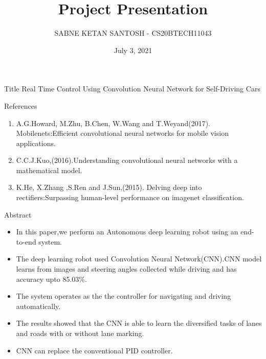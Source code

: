 \documentclass{beamer}
\title{Project Presentation}
\author{SABNE KETAN SANTOSH - CS20BTECH11043 }
\institute{Indian Institute of Technology, Hyderabad.}
\date{July 3, 2021}
\begin{document}
\begin{frame}
\titlepage
\end{frame}

\begin{frame}
    \begin{block}{Title}
      Real Time Control Using Convolution Neural Network for Self-Driving Cars  
    \end{block}
    
    \begin{block}{References}
    \begin{enumerate}
     \item A.G.Howard, M.Zhu, B.Chen, W.Wang and T.Weyand(2017). Mobilenets:Efficient convolutional neural networks for mobile vision applications.
     \item C.C.J.Kuo,(2016).Understanding convolutional neural networks with a mathematical model.
     \item K.He, X.Zhang ,S.Ren and J.Sun,(2015). Delving deep into rectifiers:Surpassing human-level performance on imagenet classification.
     \end{enumerate}
     \end{block}
\end{frame}

\begin{frame}
\begin{block}{Abstract}
\begin{itemize}
    \item In this paper,we perform an Autonomous deep learning robot using an end-to-end system.
    \item The deep learning robot used Convolution Neural Network(CNN).CNN model learns from images and steering angles collected while driving and has accuracy upto 85.03\%. 
    \item The system operates as the the controller for navigating and driving automatically.
    \item The results showed that the CNN is able to learn the diversified tasks of lanes and roads with or without lane marking.
    \item CNN can replace the conventional PID controller.
\end{itemize}
\end{block}
\end{frame}
\end{document}
